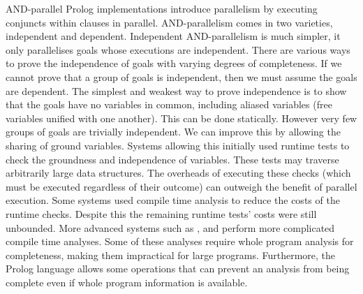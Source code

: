 AND-parallel Prolog implementations introduce parallelism by executing
conjuncts within clauses in parallel.
AND-parallelism comes in two varieties, independent and dependent.
Independent AND-parallelism is much simpler, it only parallelises goals
whose executions are independent.
There are various ways to prove the independence of goals with varying
degrees of completeness.
If we cannot prove that a group of goals is independent,
then we must assume the goals are dependent.
The simplest and weakest way to prove independence is to show that the
goals have no variables in common,
including aliased variables (free variables unified with one another).
This can be done statically.
However very few groups of goals are trivially independent.
We can improve this by allowing the sharing of ground variables.
Systems allowing this initially used runtime tests to check the groundness
and independence of variables.
These tests may traverse arbitrarily large data structures.
The overheads of executing these checks
(which must be executed regardless of their outcome)
can outweigh the benefit of parallel execution.
Some systems used compile time analysis to reduce the costs of the runtime
checks.
Despite this the remaining runtime tests' costs were still unbounded.
More advanced systems such as 
\citet{hermenegildo:1991:and-parallel},
\citet{DBLP:journals/tcs/GrasH09} and
\citet{Hermenegildo1995}
perform more complicated compile time analyses.
Some of these analyses require whole program analysis for completeness,
making them impractical for large programs.
Furthermore, the Prolog language allows some operations that can prevent an
analysis from being complete even if whole program information is available.

